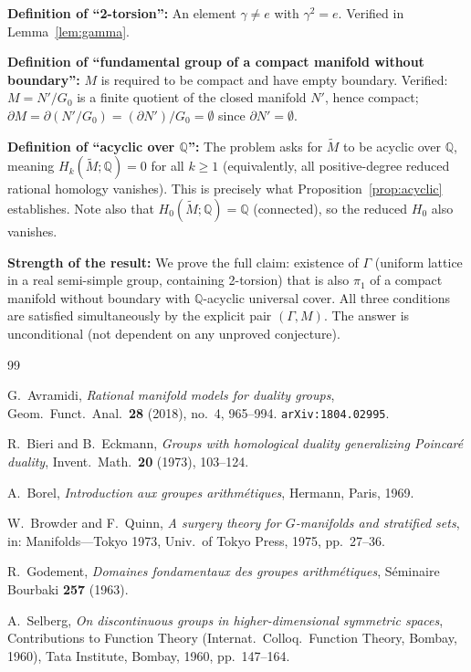 \documentclass[12pt]{article}
\theoremstyle{definition}
\theoremstyle{remark}
\begin{document}
\noindent\textbf{Definition of ``2-torsion'':} An element $\gamma \neq e$ with
$\gamma^2 = e$. Verified in Lemma~\ref{lem:gamma}.

\noindent\textbf{Definition of ``fundamental group of a compact manifold without boundary'':}
$M$ is required to be compact and have empty boundary. Verified: $M = N'/G_0$ is a
finite quotient of the closed manifold $N'$, hence compact; $\partial M = \partial(N'/G_0)
= (\partial N')/G_0 = \emptyset$ since $\partial N' = \emptyset$.

\noindent\textbf{Definition of ``acyclic over $\mathbb{Q}$'':} The problem asks for
$\widetilde{M}$ to be acyclic over $\mathbb{Q}$, meaning $H_k(\widetilde{M};\mathbb{Q}) = 0$
for all $k \geq 1$ (equivalently, all positive-degree reduced rational homology vanishes).
This is precisely what Proposition~\ref{prop:acyclic} establishes. Note also that
$H_0(\widetilde{M};\mathbb{Q}) = \mathbb{Q}$ (connected), so the reduced $H_0$ also vanishes.

\noindent\textbf{Strength of the result:} We prove the full claim: existence of $\Gamma$
(uniform lattice in a real semi-simple group, containing 2-torsion) that is also
$\pi_1$ of a compact manifold without boundary with $\mathbb{Q}$-acyclic universal cover.
All three conditions are satisfied simultaneously by the explicit pair $(\Gamma, M)$.
The answer is unconditional (not dependent on any unproved conjecture).

\begin{thebibliography}{99}

G.~Avramidi,
\emph{Rational manifold models for duality groups},
Geom.\ Funct.\ Anal.\ \textbf{28} (2018), no.~4, 965--994.
\texttt{arXiv:1804.02995}.

R.~Bieri and B.~Eckmann,
\emph{Groups with homological duality generalizing Poincar\'e duality},
Invent.\ Math.\ \textbf{20} (1973), 103--124.

A.~Borel,
\emph{Introduction aux groupes arithm\'etiques},
Hermann, Paris, 1969.

W.~Browder and F.~Quinn,
\emph{A surgery theory for $G$-manifolds and stratified sets},
in: Manifolds---Tokyo 1973, Univ.\ of Tokyo Press, 1975, pp.~27--36.

R.~Godement,
\emph{Domaines fondamentaux des groupes arithm\'etiques},
S\'eminaire Bourbaki \textbf{257} (1963).

A.~Selberg,
\emph{On discontinuous groups in higher-dimensional symmetric spaces},
Contributions to Function Theory (Internat.\ Colloq.\ Function Theory, Bombay, 1960),
Tata Institute, Bombay, 1960, pp.~147--164.

\end{thebibliography}
\end{document}
